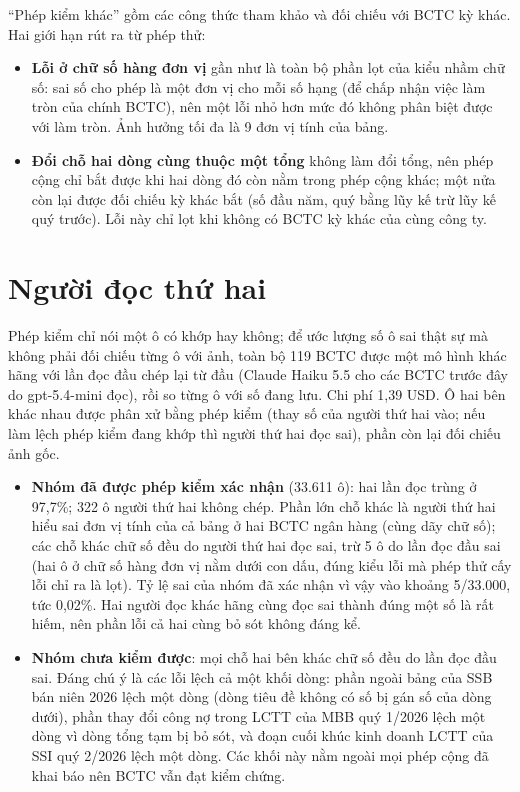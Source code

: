 \documentclass[12pt,a4paper]{report}
\newcommand{\enquote}[1]{“#1”}
\begin{document}
\enquote{Phép kiểm khác} gồm các công thức tham khảo và đối chiếu với BCTC kỳ khác. Hai giới hạn rút ra từ phép thử:
\begin{itemize}
  \item \textbf{Lỗi ở chữ số hàng đơn vị} gần như là toàn bộ phần lọt của kiểu nhầm chữ số: sai số cho phép là một đơn vị
        cho mỗi số hạng (để chấp nhận việc làm tròn của chính BCTC), nên một lỗi nhỏ hơn mức đó không phân biệt được với
        làm tròn. Ảnh hưởng tối đa là 9 đơn vị tính của bảng.
  \item \textbf{Đổi chỗ hai dòng cùng thuộc một tổng} không làm đổi tổng, nên phép cộng chỉ bắt được khi hai dòng đó còn
        nằm trong phép cộng khác; một nửa còn lại được đối chiếu kỳ khác bắt (số đầu năm, quý bằng lũy kế trừ lũy kế quý
        trước). Lỗi này chỉ lọt khi không có BCTC kỳ khác của cùng công ty.
\end{itemize}

\section{Người đọc thứ hai}\label{sec:nguoidoc2}
Phép kiểm chỉ nói một ô có khớp hay không; để ước lượng số ô sai thật sự mà không phải đối chiếu từng ô với ảnh, toàn bộ
119 BCTC được một mô hình khác hãng với lần đọc đầu chép lại từ đầu (Claude Haiku 5.5 cho các BCTC trước đây do
gpt-5.4-mini đọc), rồi so từng ô với số đang lưu. Chi phí 1,39 USD. Ô hai bên khác nhau được phân xử bằng phép kiểm (thay
số của người thứ hai vào; nếu làm lệch phép kiểm đang khớp thì người thứ hai đọc sai), phần còn lại đối chiếu ảnh gốc.

\begin{itemize}
  \item \textbf{Nhóm đã được phép kiểm xác nhận} (33.611 ô): hai lần đọc trùng ở 97,7\%; 322 ô người thứ hai không chép. Phần lớn chỗ khác là
        người thứ hai hiểu sai đơn vị tính của cả bảng ở hai BCTC ngân hàng (cùng dãy chữ số); các chỗ khác chữ số đều
        do người thứ hai đọc sai, trừ 5 ô do lần đọc đầu sai (hai ô ở chữ số hàng đơn vị nằm dưới con dấu, đúng kiểu lỗi
        mà phép thử cấy lỗi chỉ ra là lọt). Tỷ lệ sai của nhóm đã xác nhận vì vậy vào khoảng 5/33.000, tức 0,02\%.
        Hai người đọc khác hãng cùng đọc sai thành đúng một số là rất hiếm, nên phần lỗi cả hai cùng bỏ sót không đáng kể.
  \item \textbf{Nhóm chưa kiểm được}: mọi chỗ hai bên khác chữ số đều do lần đọc đầu sai. Đáng chú ý là các lỗi lệch cả
        một khối dòng: phần ngoài bảng của SSB bán niên 2026 lệch một dòng (dòng tiêu đề không có số bị gán số của dòng
        dưới), phần thay đổi công nợ trong LCTT của MBB quý 1/2026 lệch một dòng vì dòng tổng tạm bị bỏ sót, và đoạn
        cuối khúc kinh doanh LCTT của SSI quý 2/2026 lệch một dòng. Các khối này nằm ngoài mọi phép cộng đã khai báo nên
        BCTC vẫn đạt kiểm chứng.
\end{itemize}
\end{document}

